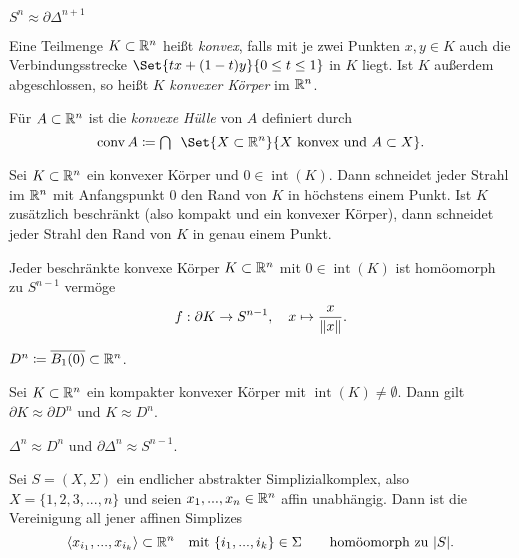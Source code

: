 \documentclass{cheat-sheet}
\newcommand{\inte}{\mathop{\mathrm{int}}} %
\newcommand{\conv}{\mathop{\mathrm{conv}}} %
\begin{document}
\begin{bsp}
  $S^n \approx \partial \Delta^{n+1}$
\end{bsp}

\begin{defn}
  Eine Teilmenge $K \subset \mathbb{R}^n$ heißt \emph{konvex}, falls mit je zwei Punkten $x, y \in K$ auch die Verbindungsstrecke $\Set{tx + (1-t)y}{ 0 \leq t \leq 1 }$ in $K$ liegt. Ist $K$ außerdem abgeschlossen, so heißt $K$ \emph{konvexer Körper} im $\mathbb{R}^n$.
\end{defn}

\begin{defn}
  Für $A \subset \mathbb{R}^n$ ist die \emph{konvexe Hülle} von $A$ definiert durch
  \[ \conv A \coloneqq \bigcap \enspace \Set{X \subset \R^n}{X \text{ konvex und } A \subset X}. \]
\end{defn}

\begin{prop}
  Sei $K \subset \mathbb{R}^n$ ein konvexer Körper und $0 \in \inte(K)$. Dann schneidet jeder Strahl im $\mathbb{R}^n$ mit Anfangspunkt $0$ den Rand von $K$ in höchstens einem Punkt. Ist $K$ zusätzlich beschränkt (also kompakt und ein konvexer Körper), dann schneidet jeder Strahl den Rand von $K$ in genau einem Punkt.
\end{prop}

\begin{prop}
  Jeder beschränkte konvexe Körper $K \subset \mathbb{R}^n$ mit $0 \in \inte(K)$ ist homöomorph zu $S^{n-1}$ vermöge
  \[ f : \partial K \to S^{n-1}, \quad x \mapsto \frac{x}{\lVert x\rVert}. \]
\end{prop}

\begin{nota}
  $D^n \coloneqq \overline{B_1(0)} \subset \mathbb{R}^n$.
\end{nota}

\begin{prop}
  Sei $K \subset \mathbb{R}^n$ ein kompakter konvexer Körper mit $\inte(K) \not= \emptyset$. Dann gilt $\partial K \approx \partial D^n$ und $K \approx D^n$.
\end{prop}

\begin{kor}
  $\Delta^n \approx D^n$ und $\partial \Delta^n \approx S^{n-1}$.
\end{kor}

\begin{prop}
  Sei $S = (X, \Sigma)$ ein endlicher abstrakter Simplizialkomplex, also $X = \{ 1, 2, 3, ..., n \}$ und seien $x_1, ..., x_n \in \mathbb{R}^n$ affin unabhängig. Dann ist die Vereinigung all jener affinen Simplizes
  \[
    \langle x_{i_1}, ..., x_{i_k} \rangle \subset \mathbb{R}^n \quad
    \text{mit $\{ i_1, ..., i_k \} \in \Sigma$} \qquad
    \text{homöomorph zu $\lvert S\rvert$.}
  \]
\end{prop}
\end{document}
